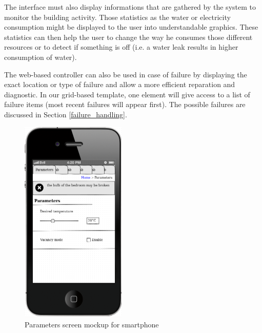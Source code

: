 \documentclass{acm_proc_article-sp}
\begin{document}
The interface must also display informations that are gathered by the system to monitor the building activity.
Those statistics as the water or electricity consumption might be displayed to the user into understandable graphics.
These statistics can then help the user to change the way he consumes those different resources or to detect if something is off (i.e. a water leak results in higher consumption of water).

The web-based controller can also be used in case of failure by displaying the exact location or type of failure and allow a more efficient reparation and diagnostic.
In our grid-based template, one element will give access to a list of failure items (most recent failures will appear first).
The possible failures are discussed in Section \ref{failure_handling}.
				\begin{figure}[htb]
  				\begin{center}
    				\includegraphics[width=5cm]{mockup}
    				\caption{Parameters screen mockup for smartphone\label{mockup}}
  				\end{center}
				\end{figure}
\end{document}
